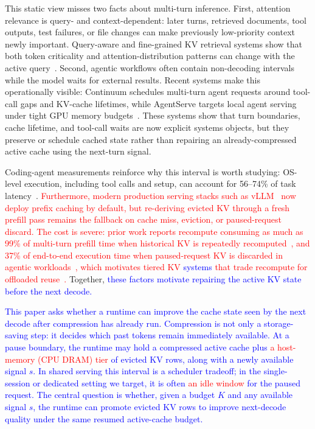 \documentclass{article}
\begin{document}
This static view misses two facts about multi-turn inference.
First, attention relevance is query- and context-dependent: later turns,
retrieved documents, tool outputs, test failures, or file changes can make
previously low-priority context newly important.
Query-aware and fine-grained KV retrieval systems show that both token
criticality and attention-distribution patterns can change with the active
query~\citep{quest,fier}.
Second, agentic workflows often contain non-decoding intervals while the
model waits for external results.
Recent systems make this operationally visible: Continuum schedules
multi-turn agent requests around tool-call gaps and KV-cache lifetimes,
while AgentServe targets local agent serving under tight GPU memory
budgets~\citep{continuum,agentserve}.
These systems show that turn boundaries, cache lifetime, and tool-call waits
are now explicit systems objects, but they preserve or schedule cached state
rather than repairing an already-compressed active cache using the next-turn
signal.

Coding-agent measurements reinforce why this interval is worth studying:
OS-level execution, including tool calls and setup, can account for
56--74\% of task latency~\citep{agentcgroup}.
\textcolor{red}{Furthermore, modern production serving stacks such as
vLLM~\citep{vllm} now deploy prefix caching by default, but re-deriving
evicted KV through a fresh prefill pass remains the fallback on cache
miss, eviction, or paused-request discard.
The cost is severe: prior work reports recompute consuming as much as
99\% of multi-turn prefill time when historical KV is repeatedly
recomputed~\citep{cachedattention}, and 37\% of end-to-end execution
time when paused-request KV is discarded in agentic
workloads~\citep{infercept}, which motivates tiered KV \textcolor{blue}{systems} that trade
recompute for offloaded reuse~\citep{lmcache,ttkv}.}
Together, \textcolor{blue}{these factors motivate repairing the active KV state before the next decode.}

\textcolor{blue}{This paper asks whether a runtime can improve the cache state seen by the
next decode after compression has already run.
Compression is not only a storage-saving step: it decides which past tokens
remain immediately available.
At a pause boundary, the runtime may hold a compressed active cache plus}
\textcolor{red}{a host-memory (CPU DRAM) tier} \textcolor{blue}{of evicted KV rows,
along with a newly available signal $s$.
In shared serving this interval is a scheduler tradeoff; in the
single-session or dedicated setting we target, it is often} \textcolor{red}{an idle window} \textcolor{blue}{for
the paused request.
The central question is whether, given a budget $K$ and any available signal
$s$, the runtime can promote evicted KV rows to improve next-decode quality
under the same resumed active-cache budget.}
\end{document}
